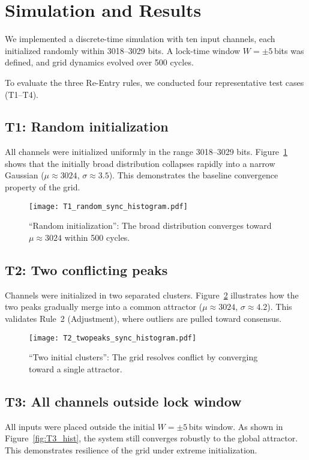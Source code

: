 \documentclass[11pt]{article}
\begin{document}
\section{Simulation and Results}
We implemented a discrete-time simulation with ten input channels, each initialized randomly within \mbox{3018--3029} bits. A lock-time window $W=\pm 5$\,bits was defined, and grid dynamics evolved over 500 cycles. 

To evaluate the three Re-Entry rules, we conducted four representative test cases (T1–T4). 

\subsection*{T1: Random initialization}
All channels were initialized uniformly in the range 3018--3029 bits.  
Figure~\ref{fig:T1_hist} shows that the initially broad distribution collapses rapidly into a narrow Gaussian ($\mu \approx 3024$, $\sigma \approx 3.5$). This demonstrates the baseline convergence property of the grid.

\begin{figure}[htbp!]
  \centering
  \texttt{[image: T1\_random\_sync\_histogram.pdf]}
  \caption{\enquote{Random initialization}: The broad distribution converges toward $\mu \approx 3024$ within 500 cycles.}
  \label{fig:T1_hist}
\end{figure}

\subsection*{T2: Two conflicting peaks}
Channels were initialized in two separated clusters.  
Figure~\ref{fig:T2_hist} illustrates how the two peaks gradually merge into a common attractor ($\mu \approx 3024$, $\sigma \approx 4.2$). This validates Rule~2 (Adjustment), where outliers are pulled toward consensus.

\begin{figure}[htbp!]
  \centering
  \texttt{[image: T2\_twopeaks\_sync\_histogram.pdf]}
  \caption{\enquote{Two initial clusters}: The grid resolves conflict by converging toward a single attractor.}
  \label{fig:T2_hist}
\end{figure}

\subsection*{T3: All channels outside lock window}
All inputs were placed outside the initial $W=\pm5$\,bits window.  
As shown in Figure~\ref{fig:T3_hist}, the system still converges robustly to the global attractor. This demonstrates resilience of the grid under extreme initialization.
\end{document}
